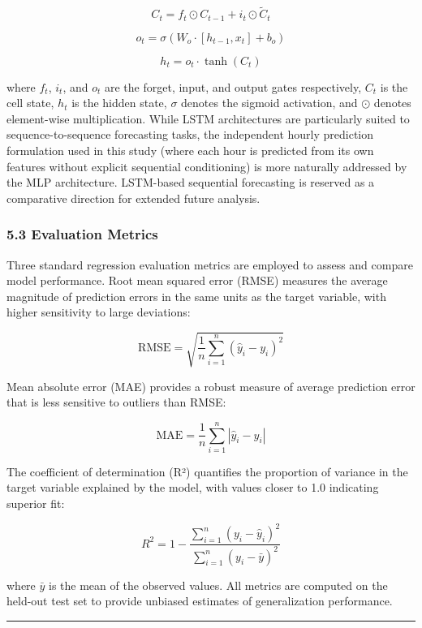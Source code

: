 \documentclass[
  11pt,
]{article}
\begin{document}
\[C_t = f_t \odot C_{t-1} + i_t \odot \tilde{C}_t\]

\[o_t = \sigma(W_o \cdot [h_{t-1}, x_t] + b_o)\]

\[h_t = o_t \cdot \tanh(C_t)\]

where \(f_t\), \(i_t\), and \(o_t\) are the forget, input, and output
gates respectively, \(C_t\) is the cell state, \(h_t\) is the hidden
state, \(\sigma\) denotes the sigmoid activation, and \(\odot\) denotes
element-wise multiplication. While LSTM architectures are particularly
suited to sequence-to-sequence forecasting tasks, the independent hourly
prediction formulation used in this study (where each hour is predicted
from its own features without explicit sequential conditioning) is more
naturally addressed by the MLP architecture. LSTM-based sequential
forecasting is reserved as a comparative direction for extended future
analysis.

\subsubsection{5.3 Evaluation Metrics}\label{evaluation-metrics}

Three standard regression evaluation metrics are employed to assess and
compare model performance. Root mean squared error (RMSE) measures the
average magnitude of prediction errors in the same units as the target
variable, with higher sensitivity to large deviations:

\[\text{RMSE} = \sqrt{\frac{1}{n}\sum_{i=1}^n (\hat{y}_i - y_i)^2}\]

Mean absolute error (MAE) provides a robust measure of average
prediction error that is less sensitive to outliers than RMSE:

\[\text{MAE} = \frac{1}{n}\sum_{i=1}^n |\hat{y}_i - y_i|\]

The coefficient of determination (R²) quantifies the proportion of
variance in the target variable explained by the model, with values
closer to 1.0 indicating superior fit:

\[R^2 = 1 - \frac{\sum_{i=1}^n (y_i - \hat{y}_i)^2}{\sum_{i=1}^n (y_i - \bar{y})^2}\]

where \(\bar{y}\) is the mean of the observed values. All metrics are
computed on the held-out test set to provide unbiased estimates of
generalization performance.

\begin{center}\rule{0.5\linewidth}{0.5pt}\end{center}
\end{document}

